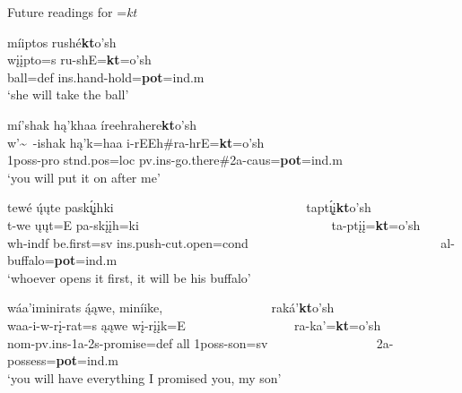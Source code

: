 \begin{exe}

\item\label{potentialfuture} Future readings for =\textit{kt}

	\begin{xlist}
	
	\item\label{potentialfuture1}
	\glll míiptos rushé\textbf{kt}o'sh\\
	wįįpto=s ru-shE=\textbf{kt}=o'sh\\
	\textnormal{ball}=def ins.hand-\textnormal{hold}=\textbf{pot}=ind.m\\
	\glt `she will take the ball' \citep[86]{hollow1973a}

	\item\label{potentialfuture3}
	\glll mí'shak hą'khaa íreehrahere\textbf{kt}o'sh\\
	w'\~~-ishak hą'k=haa i-rEEh\#ra-hrE=\textbf{kt}=o'sh\\
	1poss-pro stnd.pos=loc pv.ins-\textnormal{go.there}\#2a-caus=\textbf{pot}=ind.m\\
	\glt `you will put it on after me' \citep[109]{hollow1973a}

	\item\label{potentialfuture2}
	\glll tewé ų́ųte pask\'{ı̨}įhki ~ ~ ~ ~ ~ ~ ~ ~ ~ ~ ~ ~ ~ ~ ~ ~ ~ ~ tapt\'{ı̨}į\textbf{kt}o'sh\\
	t-we ųųt=E pa-skįįh=ki ~ ~ ~ ~ ~ ~ ~ ~ ~ ~ ~ ~ ~ ~ ~ ~ ~ ~ ta-ptįį=\textbf{kt}=o'sh\\
	wh-indf \textnormal{be.first}=sv ins.push-\textnormal{cut.open}=cond ~ ~ ~ ~ ~ ~ ~ ~ ~ ~ ~ ~ ~ ~ ~ ~ ~ ~ al-\textnormal{buffalo}=\textbf{pot}=ind.m\\
	\glt `whoever opens it first, it will be his buffalo' \citep[6]{hollow1973b}

	\item\label{potentialfuture4}
	\glll wáa'iminirats ą́ąwe, miníike, ~ ~ ~ ~ ~ ~ ~ ~ ~ ~ raká'\textbf{kt}o'sh\\
	waa-i-w-rį-rat=s ąąwe wį-rįįk=E ~ ~ ~ ~ ~ ~ ~ ~ ~ ~  ra-ka'=\textbf{kt}=o'sh\\
	nom-pv.ins-1a-2s-\textnormal{promise}=def \textnormal{all} 1poss-\textnormal{son}=sv ~ ~ ~ ~ ~ ~ ~ ~ ~ ~  2a-\textnormal{possess}=\textbf{pot}=ind.m\\
	\glt `you will have everything I promised you, my son' \citep[192]{hollow1973a}
	
	\end{xlist}

\end{exe}

